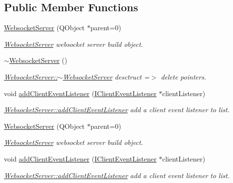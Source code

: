 \subsection*{Public Member Functions}
\begin{DoxyCompactItemize}
\item 
\hyperlink{class_websocket_server_a1c00121c9499569f5ab90bf5d71f5e17}{Websocket\-Server} (Q\-Object $\ast$parent=0)
\begin{DoxyCompactList}\small\item\em \hyperlink{class_websocket_server}{Websocket\-Server} websocket server build object. \end{DoxyCompactList}\item 
\hypertarget{class_websocket_server_a0ee0b45831865c20f40a4a1fc8a1e6a1}{\hyperlink{class_websocket_server_a0ee0b45831865c20f40a4a1fc8a1e6a1}{$\sim$\-Websocket\-Server} ()}\label{class_websocket_server_a0ee0b45831865c20f40a4a1fc8a1e6a1}

\begin{DoxyCompactList}\small\item\em \hyperlink{class_websocket_server_a0ee0b45831865c20f40a4a1fc8a1e6a1}{Websocket\-Server\-::$\sim$\-Websocket\-Server} desctruct =$>$ delete pointers. \end{DoxyCompactList}\item 
void \hyperlink{class_websocket_server_ac83322fab8d8ba8d866eae29c61e8cc5}{add\-Client\-Event\-Listener} (\hyperlink{class_i_client_event_listener}{I\-Client\-Event\-Listener} $\ast$client\-Listener)
\begin{DoxyCompactList}\small\item\em \hyperlink{class_websocket_server_ac83322fab8d8ba8d866eae29c61e8cc5}{Websocket\-Server\-::add\-Client\-Event\-Listener} add a client event listener to list. \end{DoxyCompactList}\item 
\hyperlink{class_websocket_server_a1c00121c9499569f5ab90bf5d71f5e17}{Websocket\-Server} (Q\-Object $\ast$parent=0)
\begin{DoxyCompactList}\small\item\em \hyperlink{class_websocket_server}{Websocket\-Server} websocket server build object. \end{DoxyCompactList}\item 
void \hyperlink{class_websocket_server_ac83322fab8d8ba8d866eae29c61e8cc5}{add\-Client\-Event\-Listener} (\hyperlink{class_i_client_event_listener}{I\-Client\-Event\-Listener} $\ast$client\-Listener)
\begin{DoxyCompactList}\small\item\em \hyperlink{class_websocket_server_ac83322fab8d8ba8d866eae29c61e8cc5}{Websocket\-Server\-::add\-Client\-Event\-Listener} add a client event listener to list. \end{DoxyCompactList}\end{DoxyCompactItemize}
